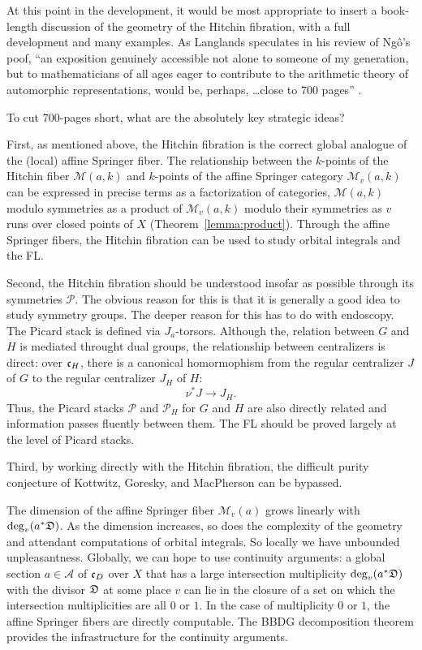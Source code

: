 \documentclass[brochure,english,12pt]{bourbaki}
\def\cc{\frak{c}}
\def\DIV{{\frak{D}}}
\def\A{{\mathcal A}}
\def\M{{\mathcal M}}
\def\P{{\mathcal P}}
\begin{document}
At this point in the development, it would be most appropriate to
insert a book-length discussion of the geometry of the Hitchin
fibration, with a full development and many examples.  As Langlands
speculates in his review of Ng\^o's poof, ``an exposition genuinely
accessible not alone to someone of my generation, but to
mathematicians of all ages eager to contribute to the arithmetic
theory of automorphic representations, would be, perhaps, \ldots close
to 700 pages'' \cite{L:Ngo}.

To cut  $700$-pages short, what are the absolutely key strategic ideas?  

First, as mentioned above, the Hitchin fibration is the correct global
analogue of the (local) affine Springer fiber.  The relationship
between the $k$-points of the Hitchin fiber $\M(a,k)$ and $k$-points
of the affine Springer category $\M_v(a,k)$ can be expressed in
precise terms as a factorization of categories, $\M(a,k)$ modulo
symmetries as a product of $\M_v(a,k)$ modulo their symmetries as $v$
runs over closed points of $X$ (Theorem~\ref{lemma:product}).  Through
the affine Springer fibers, the Hitchin fibration can be used to study
orbital integrals and the FL.

Second, the Hitchin fibration should be understood insofar as possible
through its symmetries $\P$.  The obvious reason for this is that it
is generally a good idea to study symmetry groups.  The deeper reason
for this has to do with endoscopy.  The Picard stack is defined via
$J_a$-torsors.  Although the, relation between $G$ and $H$ is mediated
throught dual groups, the relationship between centralizers is direct:
over $\cc_H$, there is a canonical homormophism from the regular
centralizer $J$ of $G$ to the regular centralizer $J_H$ of $H$:
\[
\nu^*J\to J_H.
\]
Thus, the Picard stacks $\P$ and $\P_H$ for $G$ and $H$ are also
directly related and information passes fluently between them.  The FL
should be proved largely at the level of Picard stacks.

Third, by working directly with the Hitchin fibration, the difficult
purity conjecture of Kottwitz, Goresky, and MacPherson can be
bypassed.

The dimension of the affine Springer fiber $\M_v(a)$ grows linearly
with $\deg_v(a^* \DIV)$.  As the dimension increases, so does the
complexity of the geometry and attendant computations of orbital
integrals.  So locally we have unbounded unpleasantness.  Globally, we
can hope to use continuity arguments: a global section $a\in\A$ of
$\cc_D$ over $X$ that has a large intersection multiplicity
$\deg_v(a^* \DIV)$ with the divisor $\DIV$ at some place $v$ can lie
in the closure of a set on which the intersection multiplicities are
all $0$ or $1$.  In the case of multiplicity $0$ or $1$, the affine
Springer fibers are directly computable.  The BBDG decomposition
theorem provides the infrastructure for the continuity arguments.
\end{document}
